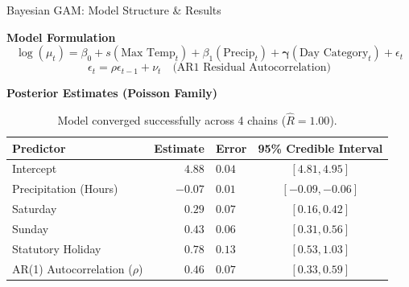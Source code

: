 \documentclass[10pt, aspectratio=169]{beamer}
\begin{document}
\begin{frame}{Bayesian GAM: Model Structure \& Results}

    \textbf{Model Formulation}
    \vspace{-0.2cm}
    \begin{equation*}
        \log(\mu_t) = \beta_0 + s(\text{Max Temp}_t) + \beta_1(\text{Precip}_t) + \boldsymbol{\gamma}(\text{Day Category}_t) + \epsilon_t
    \end{equation*}
    \vspace{-0.4cm}
    \begin{equation*}
        \epsilon_t = \rho \epsilon_{t-1} + \nu_t \quad \text{(AR1 Residual Autocorrelation)}
    \end{equation*}
    
    \vspace{0.2cm}
    
    \textbf{Posterior Estimates (Poisson Family)}
    \begin{table}
        \centering
        \small
        \begin{tabular}{lrlc}
            \toprule
            \textbf{Predictor} & \textbf{Estimate} & \textbf{Error} & \textbf{95\% Credible Interval} \\
            \midrule
            Intercept & $4.88$ & $0.04$ & $[4.81, 4.95]$ \\
            Precipitation (Hours) & $-0.07$ & $0.01$ & $[-0.09, -0.06]$ \\
            Saturday & $0.29$ & $0.07$ & $[0.16, 0.42]$ \\
            Sunday & $0.43$ & $0.06$ & $[0.31, 0.56]$ \\
            Statutory Holiday & $0.78$ & $0.13$ & $[0.53, 1.03]$ \\
            \midrule
            AR(1) Autocorrelation ($\rho$) & $0.46$ & $0.07$ & $[0.33, 0.59]$ \\
            \bottomrule
        \end{tabular}
        \caption*{\footnotesize Model converged successfully across 4 chains ($\hat{R} = 1.00$).}
    \end{table}

\end{frame}


\end{document}
